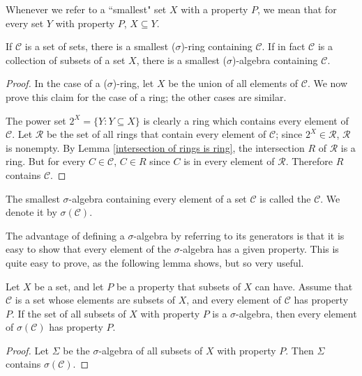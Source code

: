 \begin{subsec}
Whenever we refer to a ``smallest" set $X$ with a property $P$, we mean that for every set $Y$ with property $P$, $X \subseteq Y$.
\end{subsec}

\begin{lemma}
If $\mathcal C$ is a set of sets, there is a smallest ($\sigma$)-ring containing $\mathcal C$. If in fact $\mathcal C$ is a collection of subsets of a set $X$, there is a smallest ($\sigma$)-algebra containing $\mathcal C$.
\end{lemma}
\begin{proof}
In the case of a ($\sigma$)-ring, let $X$ be the union of all elements of $\mathcal C$.
We now prove this claim for the case of a ring; the other cases are similar.

The power set $2^X = \{Y: Y \subseteq X\}$ is clearly a ring which contains every element of $\mathcal C$.
Let $\mathcal R$ be the set of all rings that contain every element of $\mathcal C$; since $2^X \in \mathcal R$, $\mathcal R$ is nonempty.
By Lemma \ref{intersection of rings is ring}, the intersection $R$ of $\mathcal R$ is a ring.
But for every $C \in \mathcal C$, $C \in R$ since $C$ is in every element of $\mathcal R$.
Therefore $R$ contains $\mathcal C$.
\end{proof}

\begin{definition}
The smallest $\sigma$-algebra containing every element of a set $\mathcal C$ is called the  $\mathcal C$.
We denote it by $\sigma(\mathcal C)$.
\end{definition}

\begin{subsec}
The advantage of defining a $\sigma$-algebra by referring to its generators is that it is easy to show that every element of the $\sigma$-algebra has a given property.
This is quite easy to prove, as the following lemma shows, but so very useful.
\end{subsec}

\begin{lemma}
\label{generators and relations}
Let $X$ be a set, and let $P$ be a property that subsets of $X$ can have.
Assume that $\mathcal C$ is a set whose elements are subsets of $X$, and every element of $\mathcal C$ has property $P$.
If the set of all subsets of $X$ with property $P$ is a $\sigma$-algebra, then every element of $\sigma(\mathcal C)$ has property $P$.
\end{lemma}
\begin{proof}
Let $\Sigma$ be the $\sigma$-algebra of all subsets of $X$ with property $P$.
Then $\Sigma$ contains $\sigma(\mathcal C)$.
\end{proof}

